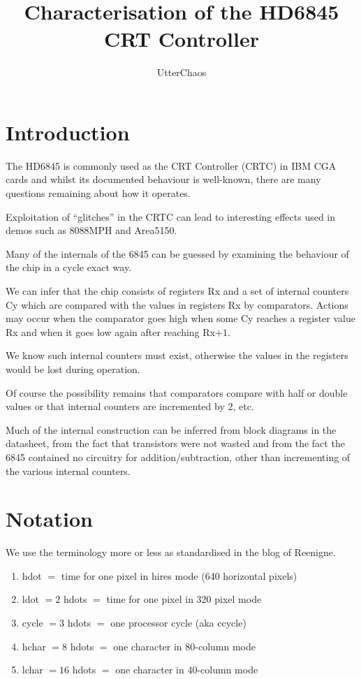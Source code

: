 \documentclass[a4paper,10pt]{amsart}
\title{Characterisation of the HD6845 CRT Controller}
\author{UtterChaos}
\begin{document}
\maketitle

\section{Introduction}

The HD6845 is commonly used as the CRT Controller (CRTC) in IBM CGA cards and
whilst its documented behaviour is well-known, there are many questions
remaining about how it operates.

Exploitation of ``glitches'' in the CRTC can lead to interesting effects used
in demos such as 8088MPH and Area5150.

Many of the internals of the 6845 can be guessed by examining the behaviour of
the chip in a cycle exact way.

We can infer that the chip consists of registers Rx and a set of internal
counters Cy which are compared with the values in registers Rx by comparators.
Actions may occur when the comparator goes high when some Cy reaches a register
value Rx and when it goes low again after reaching Rx$+1$.

We know such internal counters must exist, otherwise the values in the
registers would be lost during operation.

Of course the possibility remains that comparators compare with half or
double values or that internal counters are incremented by 2, etc.

Much of the internal construction can be inferred from block diagrams in the
datasheet, from the fact that transistors were not wasted and from the fact
the 6845 contained no circuitry for addition/subtraction, other than incrementing
of the various internal counters.

\section{Notation}

We use the terminology more or less as standardised in the blog of Reenigne.

\begin{enumerate}
\item hdot $=$ time for one pixel in hires mode (640 horizontal pixels)
\item ldot $= 2$ hdots $=$ time for one pixel in 320 pixel mode 
\item cycle $= 3$ hdots $=$ one processor cycle (aka ccycle)
\item hchar $= 8$ hdots $=$ one character in 80-column mode
\item lchar $= 16$ hdots $=$ one character in 40-column mode
\end{enumerate}
\end{document}
